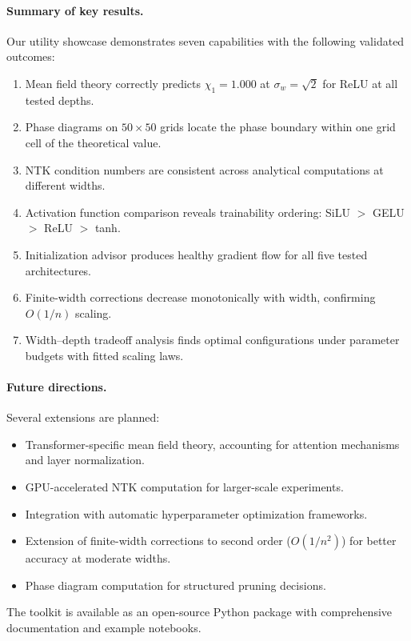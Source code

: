 \documentclass[10pt]{article}
\theoremstyle{definition}
\begin{document}
\paragraph{Summary of key results.}
Our utility showcase demonstrates seven capabilities with the following validated outcomes:
\begin{enumerate}[nosep]
  \item Mean field theory correctly predicts $\chi_1 = 1.000$ at $\sigma_w = \sqrt{2}$ for ReLU at all tested depths.
  \item Phase diagrams on $50 \times 50$ grids locate the phase boundary within one grid cell of the theoretical value.
  \item NTK condition numbers are consistent across analytical computations at different widths.
  \item Activation function comparison reveals trainability ordering: SiLU $>$ GELU $>$ ReLU $>$ tanh.
  \item Initialization advisor produces healthy gradient flow for all five tested architectures.
  \item Finite-width corrections decrease monotonically with width, confirming $O(1/n)$ scaling.
  \item Width--depth tradeoff analysis finds optimal configurations under parameter budgets with fitted scaling laws.
\end{enumerate}

\paragraph{Future directions.}
Several extensions are planned:
\begin{itemize}[nosep]
  \item Transformer-specific mean field theory, accounting for attention mechanisms and layer normalization.
  \item GPU-accelerated NTK computation for larger-scale experiments.
  \item Integration with automatic hyperparameter optimization frameworks.
  \item Extension of finite-width corrections to second order ($O(1/n^2)$) for better accuracy at moderate widths.
  \item Phase diagram computation for structured pruning decisions.
\end{itemize}

The toolkit is available as an open-source Python package with comprehensive documentation and example notebooks.
\end{document}
